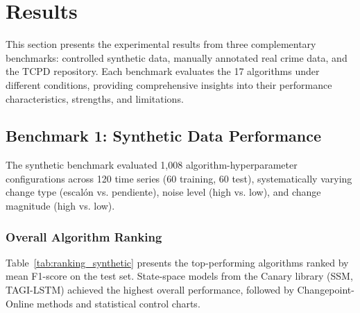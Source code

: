 
\section{Results}

This section presents the experimental results from three complementary benchmarks: controlled synthetic data, manually annotated real crime data, and the TCPD repository. Each benchmark evaluates the 17 algorithms under different conditions, providing comprehensive insights into their performance characteristics, strengths, and limitations.

\subsection{Benchmark 1: Synthetic Data Performance}

The synthetic benchmark evaluated 1,008 algorithm-hyperparameter configurations across 120 time series (60 training, 60 test), systematically varying change type (escalón vs. pendiente), noise level (high vs. low), and change magnitude (high vs. low).

\subsubsection{Overall Algorithm Ranking}

Table~\ref{tab:ranking_synthetic} presents the top-performing algorithms ranked by mean F1-score on the test set. State-space models from the Canary library (SSM, TAGI-LSTM) achieved the highest overall performance, followed by Changepoint-Online methods and statistical control charts.

